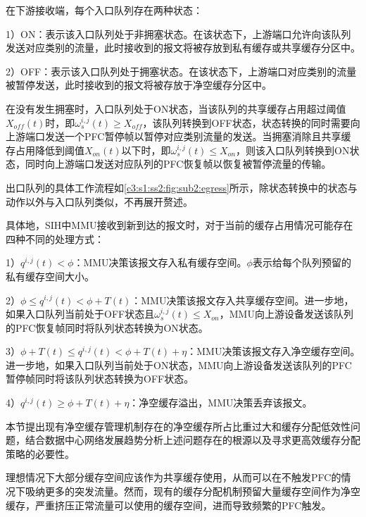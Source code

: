 在下游接收端，每个入口队列存在两种状态：

1）ON：表示该入口队列处于非拥塞状态。在该状态下，上游端口允许向该队列发送对应类别的流量，此时接收到的报文将被存放到私有缓存或共享缓存分区中。

2）OFF：表示该入口队列处于拥塞状态。在该状态下，上游端口对应类别的流量被暂停发送，此时接收到的报文将被存放于净空缓存分区中。

在没有发生拥塞时，入口队列处于ON状态，当该队列的共享缓存占用超过阈值$X_{off}(t)$时，即$\omega_s^{i,j}(t) \geqslant X_{off}$，该队列转换到OFF状态，状态转换的同时需要向上游端口发送一个PFC暂停帧以暂停对应类别流量的发送。当拥塞消除且共享缓存占用降低到阈值$X_{on}(t)$以下时，即$\omega_s^{i,j}(t) \leqslant X_{on}$，则该入口队列转换到ON状态，同时向上游端口发送对应队列的PFC恢复帧以恢复被暂停流量的传输。

出口队列的具体工作流程如\ref{c3:s1:ss2:fig:sub2:egress}所示，除状态转换中的状态与动作以外与入口队列类似，不再展开赘述。


具体地，SIH中MMU接收到新到达的报文时，对于当前的缓存占用情况可能存在四种不同的处理方式：

1）$q^{i,j}(t)<\phi$：MMU决策该报文存入私有缓存空间。$\phi$表示给每个队列预留的私有缓存空间大小。

2）$\phi \leqslant q^{i,j}(t)< \phi+T(t)$：MMU决策该报文存入共享缓存空间。进一步地，如果入口队列当前处于OFF状态且$\omega_s^{i,j}(t) \leqslant X_{on}$，MMU向上游设备发送该队列的PFC恢复帧同时将队列状态转换为ON状态。

3）$\phi+T(t) \leqslant q^{i,j}(t)<\phi +T(t)+\eta$：MMU决策该报文存入净空缓存空间。进一步地，如果入口队列当前处于ON状态，MMU向上游设备发送该队列的PFC暂停帧同时将该队列状态转换为OFF状态。

4）$q^{i,j}(t) \geqslant \phi +T(t)+\eta$：净空缓存溢出，MMU决策丢弃该报文。


\label{c3:s2:problem analysic}

本节提出现有净空缓存管理机制存在的净空缓存所占比重过大和缓存分配低效性问题，结合数据中心网络发展趋势分析上述问题存在的根源以及寻求更高效缓存分配策略的必要性。


理想情况下大部分缓存空间应该作为共享缓存使用，从而可以在不触发PFC的情况下吸纳更多的突发流量。然而，现有的缓存分配机制预留大量缓存空间作为净空缓存，严重挤压正常流量可以使用的缓存空间，进而导致频繁的PFC触发。

